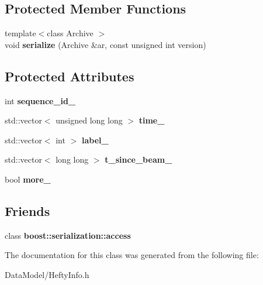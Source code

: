 \subsection*{Protected Member Functions}
\begin{DoxyCompactItemize}
\item 
\hypertarget{classHeftyInfo_a767538957878f8f708677d353c7a41db}{{\footnotesize template$<$class Archive $>$ }\\void {\bfseries serialize} (Archive \&ar, const unsigned int version)}\label{classHeftyInfo_a767538957878f8f708677d353c7a41db}

\end{DoxyCompactItemize}
\subsection*{Protected Attributes}
\begin{DoxyCompactItemize}
\item 
\hypertarget{classHeftyInfo_a0dab6f58a2c3719e087bc18b6e32e528}{int {\bfseries sequence\-\_\-id\-\_\-}}\label{classHeftyInfo_a0dab6f58a2c3719e087bc18b6e32e528}

\item 
\hypertarget{classHeftyInfo_a49dcdefaf94072a936aaba0f4d335b7b}{std\-::vector$<$ unsigned long long $>$ {\bfseries time\-\_\-}}\label{classHeftyInfo_a49dcdefaf94072a936aaba0f4d335b7b}

\item 
\hypertarget{classHeftyInfo_a8c18908b972555f6da8137ff67124eaf}{std\-::vector$<$ int $>$ {\bfseries label\-\_\-}}\label{classHeftyInfo_a8c18908b972555f6da8137ff67124eaf}

\item 
\hypertarget{classHeftyInfo_a68c89d555a59e08992862804591d4876}{std\-::vector$<$ long long $>$ {\bfseries t\-\_\-since\-\_\-beam\-\_\-}}\label{classHeftyInfo_a68c89d555a59e08992862804591d4876}

\item 
\hypertarget{classHeftyInfo_a800c1fb5443ae90314bd670e88d0afd9}{bool {\bfseries more\-\_\-}}\label{classHeftyInfo_a800c1fb5443ae90314bd670e88d0afd9}

\end{DoxyCompactItemize}
\subsection*{Friends}
\begin{DoxyCompactItemize}
\item 
\hypertarget{classHeftyInfo_ac98d07dd8f7b70e16ccb9a01abf56b9c}{class {\bfseries boost\-::serialization\-::access}}\label{classHeftyInfo_ac98d07dd8f7b70e16ccb9a01abf56b9c}

\end{DoxyCompactItemize}


The documentation for this class was generated from the following file\-:\begin{DoxyCompactItemize}
\item 
Data\-Model/Hefty\-Info.\-h\end{DoxyCompactItemize}
